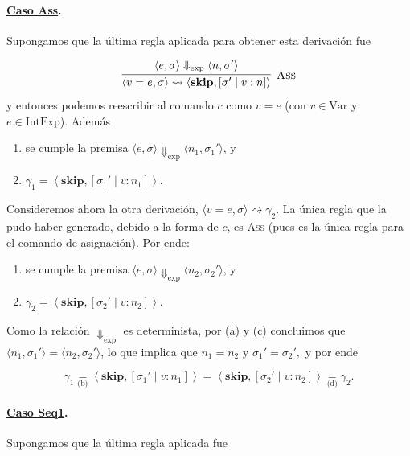 \documentclass[12pt, a4paper]{article}
\begin{document}
\paragraph{\underline{Caso Ass}.}
Supongamos que la última regla aplicada para obtener esta derivación fue

\[
  \infer[\textsc{Ass}]{\langle v = e, \sigma \rangle \rightsquigarrow \langle \textbf{skip}, [\sigma' \mid v: n] \rangle}{\langle e, \sigma \rangle \Downarrow_{\text{exp}} \langle n, \sigma' \rangle}
\]
y entonces podemos reescribir al comando $c$ como $v=e$ (con $v\in\mathrm{Var}$ y $e\in\mathrm{IntExp}$). Además
\begin{enumerate}
    \item[a.] se cumple la premisa 
    $\langle e,\sigma\rangle \Downarrow_{\text{exp}}
    \langle n_1,\sigma_1'\rangle$, y

    \item[b.] $\gamma_1 =
    \left\langle
    \textbf{skip},
    [\sigma_1' \mid v:n_1]
    \right\rangle$.
\end{enumerate}

Consideremos ahora la otra derivación, $\langle v=e,\sigma\rangle \rightsquigarrow \gamma_2.$
La única regla que la pudo haber generado, debido a la forma de $c$, es \textsc{Ass} (pues es la única regla para el comando de asignación). Por ende:
\begin{enumerate}
  \item[c.] se cumple la premisa 
  $\langle e,\sigma\rangle \Downarrow_{\text{exp}}
  \langle n_2,\sigma_2'\rangle$, y

  \item[d.] $\gamma_2
  =
  \left\langle
  \textbf{skip},
  [\sigma_2' \mid v:n_2]
  \right\rangle$.
\end{enumerate}

Como la relación $\Downarrow_{\mathrm{exp}}$ es determinista, por (a) y (c) concluimos que
$
\langle n_1,\sigma_1'\rangle
=
\langle n_2,\sigma_2'\rangle
$,
lo que implica que
$
n_1=n_2
$
y
$
\sigma_1'=\sigma_2',
$
y por ende

\[
\gamma_1
\underset{\text{(b)}}{=}
\left\langle
\textbf{skip},
[\sigma_1' \mid v:n_1]
\right\rangle
=
\left\langle
\textbf{skip},
[\sigma_2' \mid v:n_2]
\right\rangle
\underset{\text{(d)}}{=}
\gamma_2.
\]


\paragraph{\underline{Caso Seq1}.}
Supongamos que la última regla aplicada fue
\end{document}
